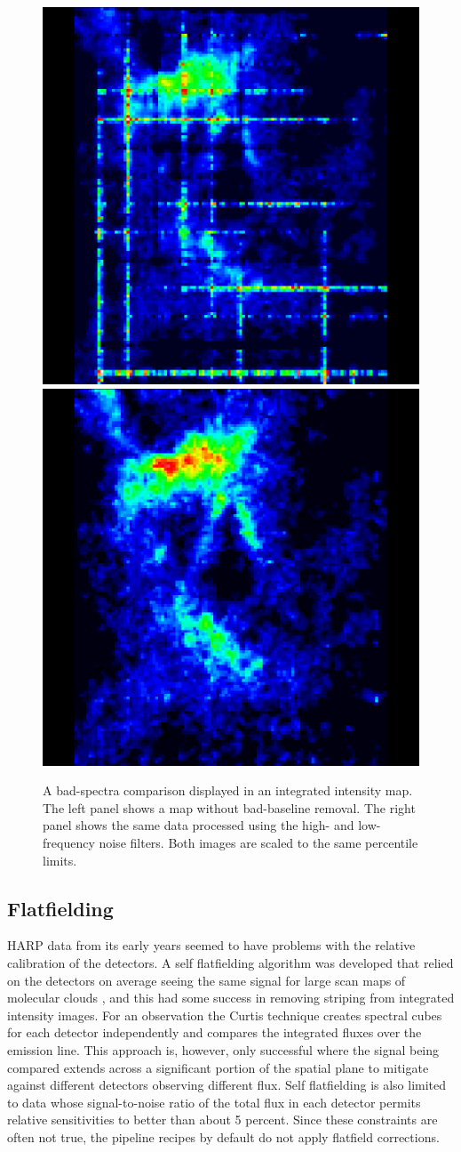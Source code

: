 \documentclass[useAMS,usenatbib]{mn2e}
\begin{document}
\begin{figure}
\includegraphics[width=0.495\columnwidth]{NGC1333_with_badbaselines.png}
\includegraphics[width=0.495\columnwidth]{NGC1333_badbaselines_removed.png}
\caption{A bad-spectra comparison displayed in an integrated intensity map.
  The left panel shows a map without bad-baseline removal.  The right
  panel shows the same data processed using the high- and
  low-frequency noise filters.  Both images are scaled to the
  same percentile limits.}
\label{fig:badbase:results}
\end{figure}

\subsection{Flatfielding}

HARP data from its early years seemed to have problems with the
relative calibration of the detectors.  A self flatfielding algorithm
was developed that relied on the detectors on average seeing the same
signal for large scan maps of molecular clouds
\citep{2010MNRAS.401..455C}, and this had some success in removing
striping from integrated intensity images.  For an observation the
Curtis technique creates spectral cubes for each detector
independently and compares the integrated fluxes over the emission
line.  This approach is, however, only successful where the signal
being compared extends across a significant portion of the spatial
plane to mitigate against different detectors observing different
flux.  Self flatfielding is also limited to data whose signal-to-noise
ratio of the total flux in each detector permits relative
sensitivities to better than about 5 percent.  Since these constraints
are often not true, the pipeline recipes by default do not apply
flatfield corrections.
\end{document}
